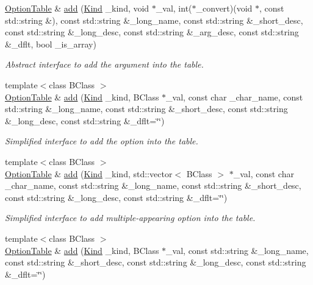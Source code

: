\begin{DoxyCompactItemize}
\hyperlink{classpoptmx_1_1OptionTable}{OptionTable} \& \hyperlink{classpoptmx_1_1OptionTable_ad97ba69700cc3672edc6328d5ec316b5}{add} (\hyperlink{group__poptmx_ga3f58821f631b466567d001183ca437e2}{Kind} \_\-kind, void $\ast$\_\-val, int($\ast$\_\-convert)(void $\ast$, const std::string \&), const std::string \&\_\-long\_\-name, const std::string \&\_\-short\_\-desc, const std::string \&\_\-long\_\-desc, const std::string \&\_\-arg\_\-desc, const std::string \&\_\-dflt, bool \_\-is\_\-array)
\begin{DoxyCompactList}\small\item\em Abstract interface to add the argument into the table. \item\end{DoxyCompactList}\item 
{\footnotesize template$<$class BClass $>$ }\\\hyperlink{classpoptmx_1_1OptionTable}{OptionTable} \& \hyperlink{group__poptmx_ga83a8a6d7752c44a0b1d94f32ebd87e04}{add} (\hyperlink{group__poptmx_ga3f58821f631b466567d001183ca437e2}{Kind} \_\-kind, BClass $\ast$\_\-val, const char \_\-char\_\-name, const std::string \&\_\-long\_\-name, const std::string \&\_\-short\_\-desc, const std::string \&\_\-long\_\-desc, const std::string \&\_\-dflt=\char`\"{}\char`\"{})
\begin{DoxyCompactList}\small\item\em Simplified interface to add the option into the table. \item\end{DoxyCompactList}\item 
{\footnotesize template$<$class BClass $>$ }\\\hyperlink{classpoptmx_1_1OptionTable}{OptionTable} \& \hyperlink{group__poptmx_gabc7aed25667e5d2901455c00348ac4cc}{add} (\hyperlink{group__poptmx_ga3f58821f631b466567d001183ca437e2}{Kind} \_\-kind, std::vector$<$ BClass $>$ $\ast$\_\-val, const char \_\-char\_\-name, const std::string \&\_\-long\_\-name, const std::string \&\_\-short\_\-desc, const std::string \&\_\-long\_\-desc, const std::string \&\_\-dflt=\char`\"{}\char`\"{})
\begin{DoxyCompactList}\small\item\em Simplified interface to add multiple-\/appearing option into the table. \item\end{DoxyCompactList}\item 
{\footnotesize template$<$class BClass $>$ }\\\hyperlink{classpoptmx_1_1OptionTable}{OptionTable} \& \hyperlink{group__poptmx_ga547f3e8c11f99e72f9c503815f9cd25a}{add} (\hyperlink{group__poptmx_ga3f58821f631b466567d001183ca437e2}{Kind} \_\-kind, BClass $\ast$\_\-val, const std::string \&\_\-long\_\-name, const std::string \&\_\-short\_\-desc, const std::string \&\_\-long\_\-desc, const std::string \&\_\-dflt=\char`\"{}\char`\"{})

\end{DoxyCompactItemize}

